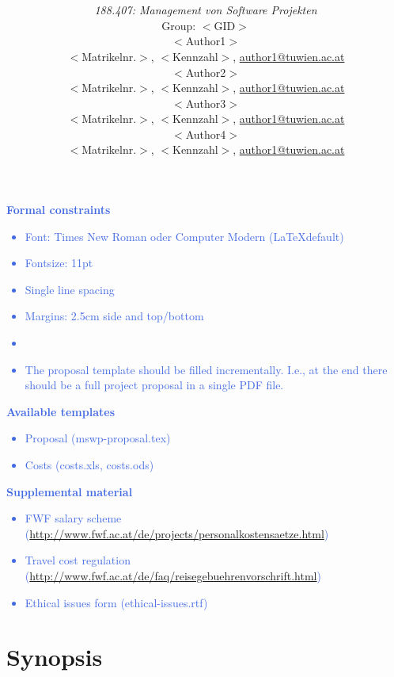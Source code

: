 \documentclass[a4paper,11pt]{article}
\title{\textbf{\sffamily\Huge \ShortTitle}\\ 
{\textbf{\sffamily\Large \FullTitle}}
\vspace{1cm}}
\author{
{\em 188.407: Management von Software Projekten} \vspace{1cm} \\
Group: $<$GID$>$\bigskip \\
$<$Author1$>$ \\ {\small $<$Matrikelnr.$>$, $<$Kennzahl$>$, \href{mailto:author1@tuwien.ac.at}{author1@tuwien.ac.at}}\\
$<$Author2$>$ \\ {\small $<$Matrikelnr.$>$, $<$Kennzahl$>$, \href{mailto:author2@tuwien.ac.at}{author1@tuwien.ac.at}}\\
$<$Author3$>$ \\ {\small $<$Matrikelnr.$>$, $<$Kennzahl$>$, \href{mailto:author3@tuwien.ac.at}{author1@tuwien.ac.at}}\\
$<$Author4$>$ \\ {\small $<$Matrikelnr.$>$, $<$Kennzahl$>$, \href{mailto:author4@tuwien.ac.at}{author1@tuwien.ac.at}}\\ 
\vspace{4cm}
}
\providecommand*{\note}[1]{\small \textcolor{RoyalBlue}{\begin{minipage}{\textwidth}{#1}\end{minipage}}}
\begin{document}
\begin{titlepage}
\maketitle

\end{titlepage}


\thispagestyle{empty}
\tableofcontents
\pagebreak

\setcounter{page}{1}



\note{
\textbf{Formal constraints}
\begin{itemize}
\item	  Font: Times New Roman oder Computer Modern (\LaTeX default)
\item    Fontsize: 11pt
\item     Single line spacing
\item     Margins: 2.5cm side and top/bottom
\item     \fbox{Language: ENGLISH}
\item    The proposal template should be filled incrementally. I.e., at the end there should be a full project proposal in a single PDF file.
\end{itemize}
\textbf{Available templates}
\begin{itemize}
\item     Proposal (mswp-proposal.tex)
\item     Costs (costs.xls, costs.ods)
\end{itemize}
\textbf{Supplemental material}
\begin{itemize}
\item     FWF salary scheme (\href{http://www.fwf.ac.at/de/projects/personalkostensaetze.html}{http://www.fwf.ac.at/de/projects/personalkostensaetze.html})
\item     Travel cost regulation (\href{http://www.fwf.ac.at/de/faq/reisegebuehrenvorschrift.html}{http://www.fwf.ac.at/de/faq/reisegebuehrenvorschrift.html})
\item     Ethical issues form (ethical-issues.rtf)
\end{itemize}
}
\pagebreak

\section{Synopsis}
\label{sect:synopsis}
\end{document}
